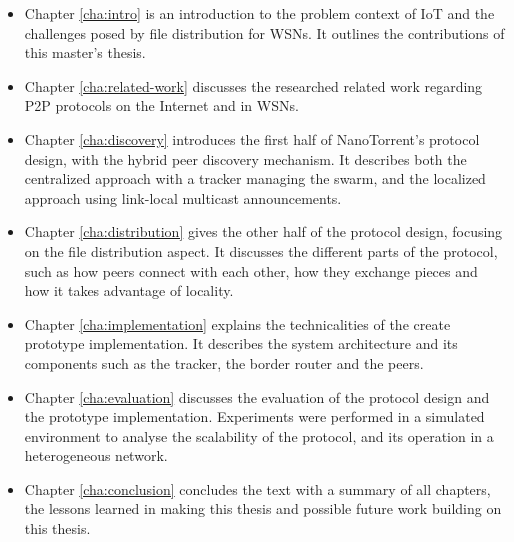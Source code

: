 \begin{itemize}

\item Chapter \ref{cha:intro} is an introduction to the problem context of \gls{IoT} and the challenges posed by file distribution for \glspl{WSN}. It outlines the contributions of this master's thesis.

\item Chapter \ref{cha:related-work} discusses the researched related work regarding \gls{P2P} protocols on the Internet and in \glspl{WSN}.

\item Chapter \ref{cha:discovery} introduces the first half of NanoTorrent's protocol design, with the hybrid peer discovery mechanism. It describes both the centralized approach with a tracker managing the swarm, and the localized approach using link-local multicast announcements.

\item Chapter \ref{cha:distribution} gives the other half of the protocol design, focusing on the file distribution aspect. It discusses the different parts of the protocol, such as how peers connect with each other, how they exchange pieces and how it takes advantage of locality.

\item Chapter \ref{cha:implementation} explains the technicalities of the create prototype implementation. It describes the system architecture and its components such as the tracker, the border router and the peers.

\item Chapter \ref{cha:evaluation} discusses the evaluation of the protocol design and the prototype implementation. Experiments were performed in a simulated environment to analyse the scalability of the protocol, and its operation in a heterogeneous network.

\item Chapter \ref{cha:conclusion} concludes the text with a summary of all chapters, the lessons learned in making this thesis and possible future work building on this thesis.

\end{itemize}